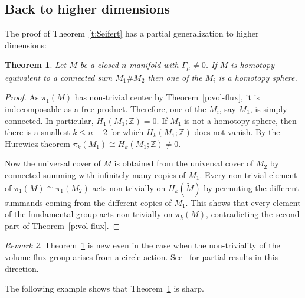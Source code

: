 \documentclass[12pt]{amsart}
\newtheorem{theorem}{Theorem}%
\theoremstyle{definition}
\theoremstyle{remark}
\newtheorem{remark}[theorem]{Remark}
\def\bZ{{\mathbb Z}}
\begin{document}
\subsection{Back to higher dimensions}
The proof of Theorem~\ref{t:Seifert} has a partial generalization to 
higher dimensions:
\begin{theorem}\label{t:irred}
    Let $M$ be a closed $n$-manifold with $\Gamma_{\mu}\neq 0$. If $M$ 
    is homotopy equivalent to a connected sum $M_{1}\# M_{2}$ then one 
    of the $M_{i}$ is a homotopy sphere.
    \end{theorem}
    \begin{proof}
	 As $\pi_{1}(M)$ has non-trivial center by Theorem~\ref{p:vol-flux}, it 
    is indecomposable as a free product. Therefore, one of the $M_{i}$, 
    say $M_{1}$, is simply connected. In particular, 
    $H_{1}(M_{1};\bZ)=0$. If $M_{1}$ is not a homotopy sphere, then 
    there is a smallest $k\leq n-2$ for which $H_{k}(M_{1};\bZ)$ does not 
    vanish. By the Hurewicz theorem $\pi_{k}(M_{1})\cong 
    H_{k}(M_{1};\bZ)\neq 0$.
    
    Now the universal cover of $M$ is obtained from the universal cover of 
    $M_{2}$ by connected summing with infinitely many copies of 
    $M_{1}$. Every non-trivial element of 
    $\pi_{1}(M)\cong\pi_{1}(M_{2})$ acts non-trivially on $H_{k}(\tilde 
    M)$ by permuting the different summands coming from the different 
    copies of $M_{1}$. This shows that every element of the 
    fundamental group acts non-trivially on $\pi_{k}(M)$, contradicting 
    the second part of Theorem~\ref{p:vol-flux}.
	\end{proof}
\begin{remark}
Theorem~\ref{t:irred} is new even in the case when the non-triviality of the 
volume flux group arises from a circle action. See~\cite{FM} for partial results
in this direction. 
\end{remark}
The following example shows that Theorem~\ref{t:irred} is sharp.
\end{document}
